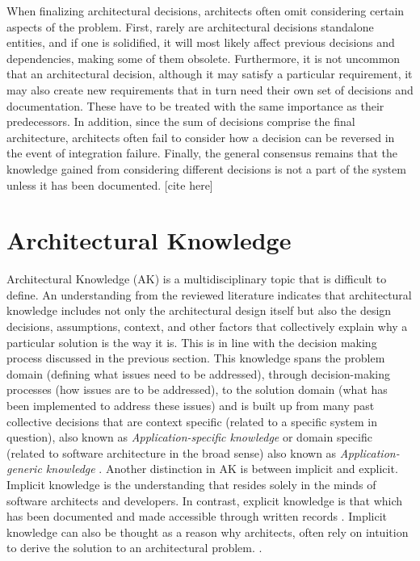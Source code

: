         When finalizing architectural decisions, architects often omit considering certain aspects of the problem. First, rarely are architectural decisions standalone entities, and if one is solidified, it will most likely affect previous decisions and dependencies, making some of them obsolete. Furthermore, it is not uncommon that an architectural decision, although it may satisfy a particular requirement, it may also create new requirements that in turn need their own set of decisions and documentation. These have to be treated with the same importance as their predecessors. In addition, since the sum of decisions comprise the final architecture, architects often fail to consider how a decision can be reversed in the event of integration failure. Finally, the general consensus remains that the knowledge gained from considering different decisions is not a part of the system unless it has been documented. [cite here]

    \section{Architectural Knowledge}
        Architectural Knowledge (AK) is a multidisciplinary topic that is difficult to define. 
        An understanding from the reviewed literature \cite{architectural_knowledge_definitions} indicates that architectural knowledge includes not only the architectural design itself but also the design decisions, assumptions, context, and other factors that collectively explain why a particular solution is the way it is. This is in line with the decision making process discussed in the previous section. This knowledge spans the problem domain (defining what issues need to be addressed), through decision-making processes (how issues are to be addressed), to the solution domain (what has been implemented to address these issues) and is built up from many past collective decisions that are context specific (related to a specific system in question), also known as \textit{Application-specific knowledge} or domain specific (related to software architecture in the broad sense) also known as\textit{ Application-generic knowledge} \cite{Patterns+ArchDecisions}. Another distinction in AK is between implicit and explicit. Implicit knowledge is the understanding that resides solely in the minds of software architects and developers. In contrast, explicit knowledge is that which has been documented and made accessible through written records \cite{AK_And_Knowledge_Management}. Implicit knowledge can also be thought as a reason why architects, often rely on intuition to derive the solution to an architectural problem. \cite{Patterns+ArchDecisions, archtitect_survey}.

